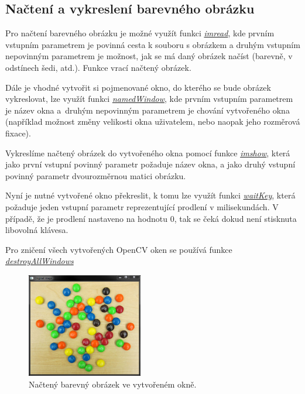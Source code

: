 \documentclass[12pt, a4paper]{article}
\begin{document}
\subsection{Načtení a vykreslení barevného obrázku}
\par{Pro načtení barevného obrázku je možné využít funkci \href{http://docs.opencv.org/modules/highgui/doc/reading_and_writing_images_and_video.html?highlight=imread#cv2.imread}{\textit{imread}}, kde prvním vstupním parametrem je povinná cesta k souboru s obrázkem a druhým vstupním nepovinným parametrem je možnost, jak se má daný obrázek načíst (barevně, v odstínech šedi, atd.). Funkce vrací načtený obrázek.

Dále je vhodné vytvořit si pojmenované okno, do kterého se bude obrázek vykreslovat, lze využít funkci \href{http://docs.opencv.org/modules/highgui/doc/user_interface.html?highlight=namedwindow#cv2.namedWindow}{\textit{namedWindow}}, kde prvním vstupním parametrem je název okna a~druhým nepovinným parametrem je chování vytvořeného okna (například možnost změny velikosti okna uživatelem, nebo naopak jeho rozměrová fixace).

Vykreslíme načtený obrázek do vytvořeného okna pomocí funkce \href{http://docs.opencv.org/modules/highgui/doc/user_interface.html?highlight=imshow#cv2.imshow}{\textit{imshow}}, která jako první vstupní povinný parametr požaduje název okna, a jako druhý vstupní povinný parametr dvourozměrnou matici obrázku.

Nyní je nutné vytvořené okno překreslit, k tomu lze využít funkci \href{http://docs.opencv.org/modules/highgui/doc/user_interface.html?highlight=waitkey#cv2.waitKey}{\textit{waitKey}}, která požaduje jeden vstupní parametr reprezentující prodlení v milisekundách. V případě, že je prodlení nastaveno na hodnotu 0, tak se čeká dokud není stisknuta libovolná klávesa.

Pro zničení všech vytvořených OpenCV oken se používá funkce \href{http://docs.opencv.org/modules/highgui/doc/user_interface.html?highlight=destroyallwindows#cv2.destroyAllWindows}{\textit{destroyAllWindows}}
\begin{figure}[!ht]
	\centering
	\includegraphics[width=0.45\textwidth]{Original_image.png}
	\caption{Načtený barevný obrázek ve vytvořeném okně.}	
\end{figure}
}
\end{document}
